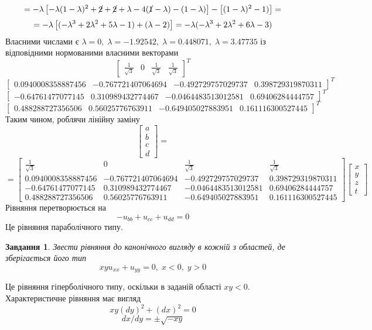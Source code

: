 \documentclass[12pt]{article} %
\newtheorem{prob}{Завдання}
\begin{document}
\[=-\lambda\left[-\lambda(1-\lambda)^2+\cancel{2}+\cancel{2}+\lambda-4(\cancel{1}-\lambda)-(1-\lambda)\right]-\left[(1-\lambda)^2-1)\right]=\]
\[=-\lambda\left[(-\lambda^3+2\lambda^2+5\lambda-1)+(\lambda-2)\right]=-\lambda(-\lambda^3+2\lambda^2+6\lambda-3)\]
Власними числами є $\lambda=0,\;\lambda=-1.92542,\;\lambda=0.448071,\;\lambda=3.47735$ із відповідними нормованими власними векторами
\[\begin{bmatrix}\frac{1}{\sqrt{3}}&0&\frac{1}{\sqrt{3}}&\frac{1}{\sqrt{3}}\end{bmatrix}^T\]
\[\begin{bmatrix}0.0940008358887456&-0.767721407064694&-0.492729757029737&0.398729319870311\end{bmatrix}^T\]
\[\begin{bmatrix}-0.64761477077145&0.310989432774467&-0.0464483513012581&0.69406284444757\end{bmatrix}^T\]
\[\begin{bmatrix}0.488288727356506&0.56025776763911&-0.649405027883951&0.161116300527445\end{bmatrix}^T\]
Таким чином, роблячи лінійну заміну
\[\begin{bmatrix}a\\b\\c\\d\end{bmatrix}=\]\[=
\begin{bmatrix}\frac{1}{\sqrt{3}}&0&\frac{1}{\sqrt{3}}&\frac{1}{\sqrt{3}}\\
0.0940008358887456&-0.767721407064694&-0.492729757029737&0.398729319870311\\
-0.64761477077145&0.310989432774467&-0.0464483513012581&0.69406284444757\\
0.488288727356506&0.56025776763911&-0.649405027883951&0.161116300527445\end{bmatrix}\begin{bmatrix}x\\y\\z\\t\end{bmatrix}\]
Рівняння перетворюється на
\[-u_{bb}+u_{cc}+u_{dd}=0\]
Це рівняння параболічного типу.
\begin{prob}Звести рівняння до канонічного вигляду в кожній з областей, де зберігається його тип
	\[xyu_{xx}+u_{yy}=0,\;x<0,\;y>0\]
\end{prob}
Це рівняння гіперболічного типу, оскільки в заданій області $xy<0$. Характеристичне рівняння має вигляд
\[xy(dy)^2+(dx)^2=0\]
\[dx/dy=\pm\sqrt{-xy}\]
\end{document}
